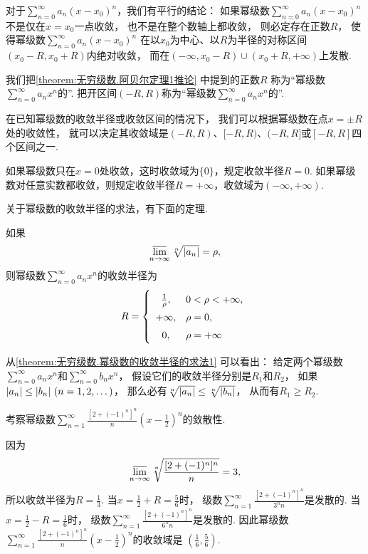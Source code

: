 对于\(\sum_{n=0}^\infty a_n (x-x_0)^n\)，我们有平行的结论：
如果幂级数\(\sum_{n=0}^\infty a_n (x-x_0)^n\)不是仅在\(x=x_0\)一点收敛，
也不是在整个数轴上都收敛，
则必定存在正数\(R\)，
使得幂级数\(\sum_{n=0}^\infty a_n (x-x_0)^n\)
在以\(x_0\)为中心、以\(R\)为半径的对称区间\((x_0-R,x_0+R)\)内绝对收敛，
而在\((-\infty,x_0-R)\cup(x_0+R,+\infty)\)上发散.

我们把\cref{theorem:无穷级数.阿贝尔定理1推论} 中提到的正数\(R\)
称为“幂级数\(\sum_{n=0}^\infty a_n x^n\)的”.
把开区间\((-R,R)\)称为“幂级数\(\sum_{n=0}^\infty a_n x^n\)的”.

在已知幂级数的收敛半径或收敛区间的情况下，
我们可以根据幂级数在点\(x = \pm R\)处的收敛性，
就可以决定其收敛域是\((-R,R)\)、\([-R,R)\)、\((-R,R]\)或\([-R,R]\)四个区间之一.

如果幂级数只在\(x=0\)处收敛，这时收敛域为\(\{0\}\)，规定收敛半径\(R=0\).
如果幂级数对任意实数都收敛，则规定收敛半径\(R=+\infty\)，收敛域为\((-\infty,+\infty)\).

关于幂级数的收敛半径的求法，有下面的定理.
\begin{theorem}\label{theorem:无穷级数.幂级数的收敛半径的求法1}
如果\[
	\varlimsup_{n\to\infty} \sqrt[n]{\abs{a_n}} = \rho,
\]
则幂级数\(\sum_{n=0}^\infty a_n x^n\)的收敛半径为\[
	R = \left\{ \def\arraystretch{1.5} \begin{array}{cl}
		\frac1\rho, & 0<\rho<+\infty, \\
		+\infty, & \rho = 0, \\
		0, & \rho = +\infty \\
	\end{array} \right.
\]
\end{theorem}
\begin{remark}
从\cref{theorem:无穷级数.幂级数的收敛半径的求法1} 可以看出：
给定两个幂级数\(\sum_{n=0}^\infty a_n x^n\)和\(\sum_{n=0}^\infty b_n x^n\)，
假设它们的收敛半径分别是\(R_1\)和\(R_2\)，
如果\(\abs{a_n} \leq \abs{b_n}\ (n=1,2,\dotsc)\)，
那么必有\(\sqrt[n]{\abs{a_n}} \leq \sqrt[n]{\abs{b_n}}\)，
从而有\(R_1 \geq R_2\).
\end{remark}

\begin{example}
考察幂级数\(\sum_{n=1}^\infty \frac{[2+(-1)^n]^n}{n} \left(x-\frac12\right)^n\)的敛散性.
\begin{solution}
因为\[
	\varlimsup_{n\to\infty} \sqrt[n]{\frac{[2+(-1)^n]^n}n} = 3,
\]
所以收敛半径为\(R=\frac13\).
当\(x=\frac12+R=\frac56\)时，
级数\(\sum_{n=1}^\infty \frac{[2+(-1)^n]^n}{3^n n}\)是发散的.
当\(x=\frac12-R=\frac16\)时，
级数\(\sum_{n=1}^\infty \frac{[2+(-1)^n]^n}{6^n n}\)是发散的.
因此幂级数\(\sum_{n=1}^\infty \frac{[2+(-1)^n]^n}{n} \left(x-\frac12\right)^n\)的收敛域是
\(\left(\frac16,\frac56\right)\).
\end{solution}
\end{example}

